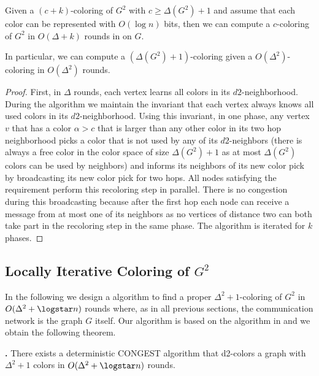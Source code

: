 \begin{theorem}
\label{thm:delta2_simple_color}
Given a $(c+k)$-coloring of $G^2$ with $c\geq \Delta(G^2)+1$ and assume that each color can be represented with $O(\log n)$ bits, then we can compute a $c$-coloring of $G^2$ in $O(\Delta+k)$ rounds in {\congest} on $G$. 

In particular, we can compute a $(\Delta(G^2)+1)$-coloring given a $O(\Delta^2)$-coloring in $O(\Delta^2)$ rounds.
\end{theorem}
\begin{proof}
First, in $\Delta$ rounds, each vertex learns all colors in its $d2$-neighborhood. During the algorithm we maintain the invariant that each vertex always knows all used colors in its $d2$-neighborhood. 
Using this invariant, in one phase, any vertex $v$ that has a color $\alpha>c$ that is larger than any other color in its two hop neighborhood picks a color that is not used by any of its $d2$-neighbors (there is always a free color in the color space of size $\Delta(G^2)+1$ as at most $\Delta(G^2)$ colors can be used by neighbors) and informs its neighbors of its new color pick by broadcasting its new color pick for two hops. All nodes satisfying the requirement perform this recoloring step in parallel. 
There is no congestion during this broadcasting because after the first hop each node can receive a message from at most one of its neighbors as no vertices of distance two can both take part in the recoloring step in the same phase. The algorithm is iterated for $k$ phases.
\end{proof}





\subsection{Locally Iterative Coloring of $G^2$}

In the following we design a {\congest} algorithm to find a proper $\Delta^2+1$-coloring of $G^2$ in $O(\Delta^2+\logstar n)$ rounds where, as in all previous sections, the communication network is the graph $G$ itself.  Our algorithm is based on the algorithm in \cite{BEG18} and we obtain the following theorem.

\medskip
\noindent \textbf{.} 
There exists a deterministic CONGEST algorithm that d2-colors a graph with $\Delta^2+1$ colors in $O(\Delta^2+\logstar n)$ rounds.

\medskip



